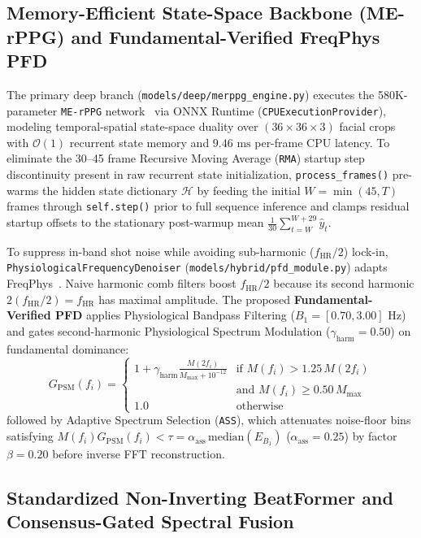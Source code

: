 \documentclass[conference]{IEEEtran}
\begin{document}
\subsection{Memory-Efficient State-Space Backbone (ME-rPPG) and Fundamental-Verified FreqPhys PFD}

The primary deep branch (\texttt{models/deep/merppg\_engine.py}) executes the 580K-parameter \texttt{ME-rPPG} network~\cite{wang2025merppg} via ONNX Runtime (\texttt{CPUExecutionProvider}), modeling temporal-spatial state-space duality over $(36\times 36\times 3)$ facial crops with $\mathcal{O}(1)$ recurrent state memory and $9.46\text{ ms}$ per-frame CPU latency. To eliminate the 30--45 frame Recursive Moving Average (\texttt{RMA}) startup step discontinuity present in raw recurrent state initialization, \texttt{process\_frames()} pre-warms the hidden state dictionary $\mathcal{H}$ by feeding the initial $W = \min(45, T)$ frames through \texttt{self.step()} prior to full sequence inference and clamps residual startup offsets to the stationary post-warmup mean $\frac{1}{30}\sum_{t=W}^{W+29}\hat{y}_t$.

To suppress in-band shot noise while avoiding sub-harmonic ($f_{\text{HR}}/2$) lock-in, \texttt{PhysiologicalFrequencyDenoiser} (\texttt{models/hybrid/pfd\_module.py}) adapts FreqPhys~\cite{qian2026freqphys}. Naive harmonic comb filters boost $f_{\text{HR}}/2$ because its second harmonic $2(f_{\text{HR}}/2) = f_{\text{HR}}$ has maximal amplitude. The proposed \textbf{Fundamental-Verified PFD} applies Physiological Bandpass Filtering ($B_1 = [0.70, 3.00]\text{ Hz}$) and gates second-harmonic Physiological Spectrum Modulation ($\gamma_{\text{harm}} = 0.50$) on fundamental dominance:
\begin{equation}
G_{\text{PSM}}(f_i) = \begin{cases}
1 + \gamma_{\text{harm}}\frac{M(2f_i)}{M_{\max} + 10^{-12}} & \text{if } M(f_i) > 1.25\,M(2f_i) \\
 & \text{and } M(f_i) \ge 0.50\,M_{\max} \\
1.0 & \text{otherwise}
\end{cases}
\label{eq:pfd_psm}
\end{equation}
followed by Adaptive Spectrum Selection (\texttt{ASS}), which attenuates noise-floor bins satisfying $M(f_i)G_{\text{PSM}}(f_i) < \tau = \alpha_{\text{ass}}\,\text{median}(E_{B_1})$ ($\alpha_{\text{ass}} = 0.25$) by factor $\beta = 0.20$ before inverse FFT reconstruction.

\subsection{Standardized Non-Inverting BeatFormer and Consensus-Gated Spectral Fusion}
\label{sec:beatformer}
\end{document}
